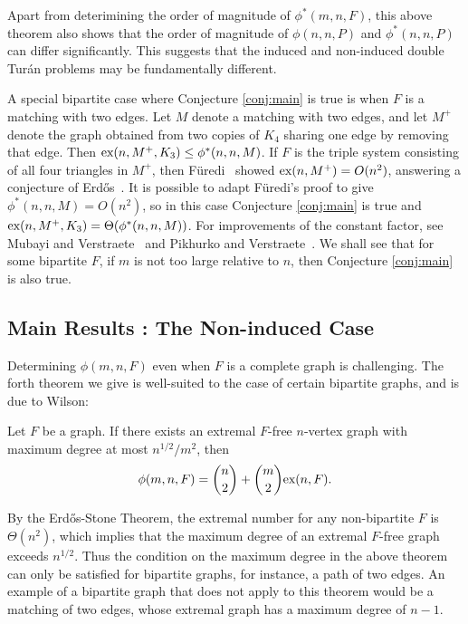 Apart from deterimining the order of magnitude of $\phi^*(m, n, F)$, this above theorem also shows that the order of magnitude of $\phi(n, n, P)$ and $\phi^*(n, n, P)$ can differ significantly. This suggests that the induced and non-induced double Tur\'{a}n problems may be fundamentally different.

A special bipartite case where Conjecture \ref{conj:main} is true is when $F$ is a matching with two edges. Let $M$ denote a matching with two edges, and let $M^+$ denote the graph obtained from two copies of $K_4$ sharing one edge by removing that edge. Then  $\textnormal{ex}(n, M^+, K_3) \leq \phi^*(n, n, M)$. If $F$ is the triple system consisting of all four triangles in $M^+$, then F\"{u}redi~\cite{Furedi1984} showed $\textnormal{ex}(n, M^+) = O(n^2)$, answering a conjecture of Erd\H{o}s~\cite{Erdos1977}. It is possible to adapt F\"{u}redi's proof to give $\phi^*(n, n, M) = O(n^2)$, so in this case Conjecture \ref{conj:main} is true and $\textnormal{ex}(n, M^+, K_3) = \Theta(\phi^*(n, n, M))$. For improvements of the constant factor, see Mubayi and Verstraete~\cite{MubayiV2004} and Pikhurko and Verstraete~\cite{PikhurkoV2009}. We shall see that for some bipartite $F$, if $m$ is not too large relative to $n$, then Conjecture \ref{conj:main} is also true. 

\subsection{Main Results : The Non-induced Case}

Determining $\phi(m, n, F)$ even when $F$ is a complete graph is challenging. The forth theorem we give is well-suited to the case of certain bipartite graphs, and is due to Wilson:

\begin{theorem}\label{wilsontheorem}
  Let $F$ be a graph. If there exists an extremal $F$-free $n$-vertex graph with maximum degree at most $n^{1/2}/m^2$, then 
  \[ 
    \phi(m, n, F) = \binom{n}{2} + \binom{m}{2}\textnormal{ex}(n,F).
  \]
\end{theorem}

By the Erd\H{o}s-Stone Theorem, the extremal number for any non-bipartite $F$ is $\Theta(n^2)$, which implies that the maximum degree of an extremal $F$-free graph exceeds $n^{1/2}$. Thus the condition on the maximum degree in the above theorem can only be satisfied for bipartite graphs, for instance, a path of two edges. An example of a bipartite graph that does not apply to this theorem would be a matching of two edges, whose extremal graph has a maximum degree of $n - 1$. 

